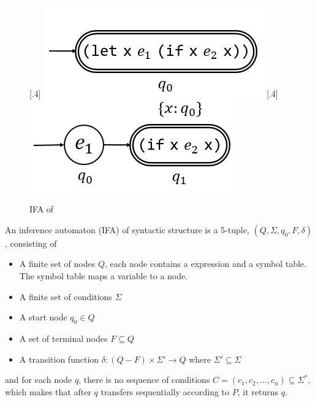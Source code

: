 \begin{figure}[t]
    \centering
    [.4\linewidth]{
        \includegraphics[scale=0.25]{images/ifa/ifa-and-1.png}
    }
    [.4\linewidth]{
        \includegraphics[scale=0.25]{images/ifa/ifa-and-2.png}
    }
    \caption{IFA of }
    \label{fig:ifa-and}
\end{figure}


\begin{Def}

    An inference automaton (IFA) of syntactic structure  is a 5-tuple, $(Q, \Sigma, q_0, F, \delta)$, consisting of

    \begin{itemize}
        \item A finite set of nodes $Q$, each node contains a expression and a symbol table. The symbol table maps a variable to a node.
        \item A finite set of conditions $\Sigma$
        \item A start node $q_0 \in Q$
        \item A set of terminal nodes $F \subseteq Q$
        \item A transition function $\delta: (Q-F) \times \Sigma' \to Q$ where $\Sigma' \subseteq \Sigma$
    \end{itemize}

    and for each node $q$, there is no sequence of conditions $C = (c_1,c_2,\ldots,c_n)\subseteq \Sigma^*$, which makes that after $q$ transfers sequentially according to $P$, it returns $q$.

\end{Def}


